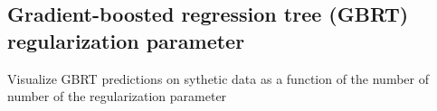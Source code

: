 \documentclass[11pt]{article}
\begin{document}
    \begin{center}
    \end{center}
    { \hspace*{\fill} \\}
    
    \begin{center}
    \end{center}
    { \hspace*{\fill} \\}
    
    \begin{center}
    \end{center}
    { \hspace*{\fill} \\}
    
    \begin{center}
    \end{center}
    { \hspace*{\fill} \\}
    
    \begin{center}
    \end{center}
    { \hspace*{\fill} \\}
    
    \subsection{Gradient-boosted regression tree (GBRT) regularization
parameter}\label{gradient-boosted-regression-tree-gbrt-regularization-parameter}

Visualize GBRT predictions on sythetic data as a function of the number
of number of the regularization parameter
\end{document}
